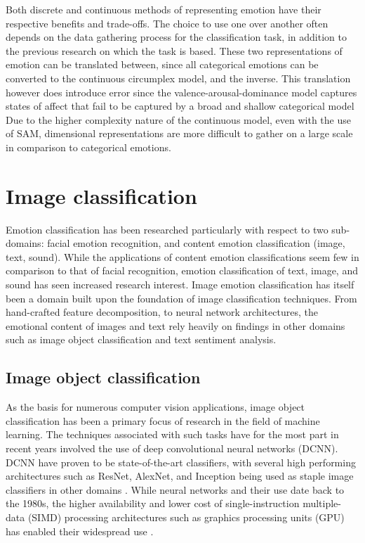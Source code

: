 \documentclass{article}
\begin{document}
Both discrete and continuous methods of representing emotion have their respective benefits and trade-offs.
The choice to use one over another often depends on the data gathering process for the classification task, in addition to the previous research on which the task is based.
These two representations of emotion can be translated between, since all categorical emotions can be converted to the continuous circumplex model, and the inverse.
This translation however does introduce error since the valence-arousal-dominance model captures states of affect that fail to be captured by a broad and shallow categorical model 
Due to the higher complexity nature of the continuous model, even with the use of SAM, dimensional representations are more difficult to gather on a large scale in comparison to categorical emotions.


\section{Image classification}

Emotion classification has been researched particularly with respect to two sub-domains: facial emotion recognition, and content emotion classification (image, text, sound).
While the applications of content emotion classifications seem few in comparison to that of facial recognition, emotion classification of text, image, and sound has seen increased research interest.
Image emotion classification has itself been a domain built upon the foundation of image classification techniques.
From hand-crafted feature decomposition, to neural network architectures, the emotional content of images and text rely heavily on findings in other domains such as image object classification and text sentiment analysis.

\subsection{Image object classification}

As the basis for numerous computer vision applications, image object classification has been a primary focus of research in the field of machine learning.
The techniques associated with such tasks have for the most part in recent years involved the use of deep convolutional neural networks (DCNN).
DCNN have proven to be state-of-the-art classifiers, with several high performing architectures such as ResNet, AlexNet, and Inception being used as staple image classifiers in other domains \citep{pan2009survey}.
While neural networks and their use date back to the 1980s, the higher availability and lower cost of single-instruction multiple-data (SIMD) processing architectures such as graphics processing units (GPU) has enabled their widespread use \citep{rawat2017deep}.
\end{document}
